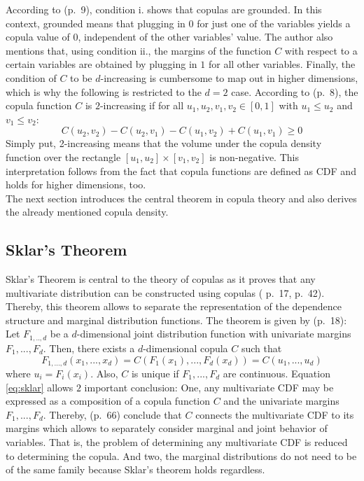 \documentclass[
]{krantz}
\begin{document}
According to \citet{nelsen2006} (p.~9), condition i. shows that copulas
are grounded. In this context, grounded means that
plugging in \(0\) for just one of the variables yields a copula value of \(0\), independent of the
other variables' value.
The author also mentions that, using condition ii., the margins of the function \(C\) with respect to a certain variables are obtained by
plugging in \(1\) for all other variables.
Finally, the condition of \(C\) to be \(d\)-increasing is cumbersome to map out in
higher dimensions, which is why the following is restricted to the \(d = 2\) case.
According to \citet{nelsen2006} (p.~8), the copula function \(C\) is
\(2\)-increasing if for all \(u_1, u_2, v_1, v_2 \in [0,1]\) with
\(u_1 \leq u_2\) and \(v_1 \leq v_2\):
\[
C(u_2, v_2) - C(u_2, v_1) - C(u_1, v_2) + C(u_1, v_1) \geq 0
\label{eq:twoincreasing}
\]
Simply put, 2-increasing means that the volume under the copula density
function over the rectangle \([u_1, u_2] \times [v_1, v_2]\) is
non-negative. This interpretation follows from the fact that copula functions are defined as CDF and holds for higher dimensions, too.\\
The next section introduces the central theorem in copula theory and also derives the already mentioned copula density.

\subsection{Sklar's Theorem}\label{sklarstheorem}

Sklar's Theorem is central to the theory of copulas as it proves
that any multivariate distribution can be constructed using copulas
(\citet{nelsen2006} p.~17, \citet{durante2016} p.~42). Thereby, this theorem allows
to separate the representation of the dependence structure and marginal
distribution functions. The theorem is given by \citet{nelsen2006} (p.~18):\\
Let \(F_{1,..,d}\) be a \(d\)-dimensional joint distribution function with
univariate margins \(F_1, ..., F_d\). Then, there exists a \(d\)-dimensional
copula \(C\) such that
\[
F_{1, ..., d}(x_1, ..., x_d)  = C(F_1(x_1), ..., F_d(x_d)) = C(u_1, ..., u_d)
\label{eq:sklar}
\]
where \(u_i = F_i(x_i)\). Also, \(C\) is unique if \(F_1, ..., F_d\) are continuous.
Equation \eqref{eq:sklar} allows \(2\) important conclusion: One,
any multivariate CDF may be expressed as a composition of a copula
function \(C\) and the univariate margins \(F_1, ..., F_d\). Thereby,
\citet{zhang2019} (p.~66) conclude that \(C\) connects the multivariate CDF to
its margins which allows to separately consider marginal and
joint behavior of variables. That is, the problem of determining any
multivariate CDF is reduced to determining the copula. And two, the
marginal distributions do not need to be of the same family because
Sklar's theorem holds regardless.
\end{document}
